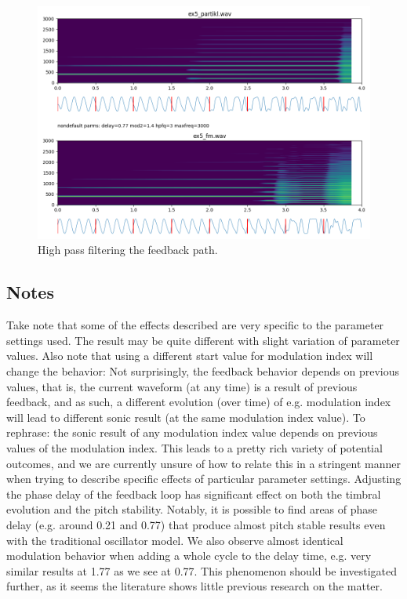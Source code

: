 \documentclass[runningheads,a4paper]{llncs}
\begin{document}
\begin{figure}
	\centering
	\includegraphics[width=.95\textwidth]{ex5_compare.png}
	\caption{High pass filtering the feedback path.}
	\label{fig:ex5}
\end{figure}

\subsection{Notes}
Take note that some of the effects described are very specific to the parameter settings used. The result may be quite different with slight variation of parameter values. Also note that using a different start value for modulation index will change the behavior: Not surprisingly, the feedback behavior depends on previous values, that is, the current waveform (at any time) is a result of previous feedback, and as such, a different evolution (over time) of e.g. modulation index will lead to different sonic result (at the same modulation index value). To rephrase: the sonic result of any modulation index value depends on previous values of the modulation index. This leads to a pretty rich variety of potential outcomes, and we are currently unsure of how to relate this in a stringent manner when trying to describe specific effects of particular parameter settings.
Adjusting the phase delay of the feedback loop has significant effect on both the timbral evolution and the pitch stability. Notably, it is possible to find areas of phase delay (e.g. around 0.21 and 0.77) that produce almost pitch stable results even with the traditional oscillator model. We also observe almost identical modulation behavior when adding a whole cycle to the delay time, e.g. very similar results at 1.77 as we see at 0.77. This phenomenon should be investigated further, as it seems the literature shows little previous research on the matter.
\end{document}
